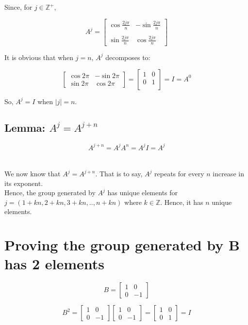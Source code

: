 \documentclass[12pt]{article}
\begin{document}
	Since, for $j\in\mathbb{Z}^{+}$,

	\[	
		A^j
		=
		\begin{bmatrix}
			\cos\frac{2j\pi}{n} & -\sin\frac{2j\pi}{n} \\
			\\
			\sin\frac{2j\pi}{n} &  \cos\frac{2j\pi}{n}
		\end{bmatrix}
	\]

	It is obvious that when $j = n$, $A^j$ decomposes to:

	\[
		\begin{bmatrix}
			\cos 2\pi & -\sin 2\pi \\
			\sin 2\pi &  \cos 2\pi
		\end{bmatrix}
		=
		\begin{bmatrix}
			1 & 0 \\
			0 & 1 \\
		\end{bmatrix}
		= I = A^0
	\]

	So, $A^j = I$ when $|j| = n$. \\


	\subsection*{Lemma: $A^j = A^{j+n}$}

	\[
		A^{j+n} = A^jA^n = A^jI = A^j
	\]

	\section*{}

	We now know that $A^j = A^{j+n}$. That is to say, $A^j$ repeats for every $n$ increase in its exponent. \\
	Hence, the group generated by $A^j$ has unique elements for $j = (1+kn, 2+kn, 3+kn, .., n+kn)$ where $k\in\mathbb{Z}$. Hence, it has $n$ unique elements.  
	\\

	\section*{Proving the group generated by B has 2 elements}

	\[
		B = 
		\begin{bmatrix}
			1 & 0 \\
			0 & -1
		\end{bmatrix}
	\]

	\[
		B^2 = 
		\begin{bmatrix}
			1 & 0 \\
			0 & -1
		\end{bmatrix}
		\begin{bmatrix}
			1 & 0 \\
			0 & -1
		\end{bmatrix}
		= 
		\begin{bmatrix}
			1 & 0 \\
			0 & 1
		\end{bmatrix}
		= I
	\]
\end{document}
